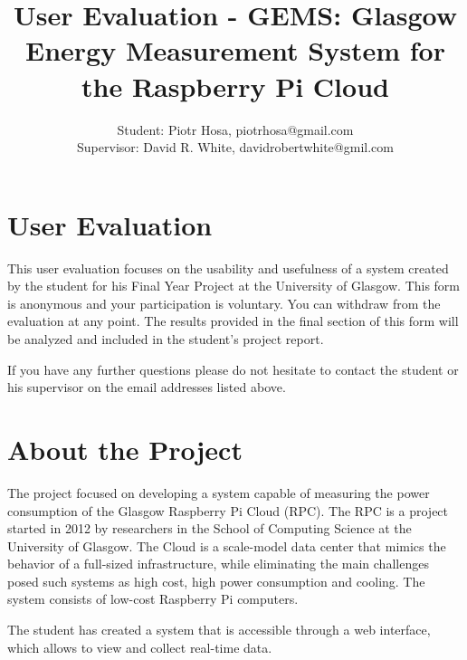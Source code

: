 \documentclass[12pt]{article}
\begin{document}

\title{User Evaluation - GEMS: Glasgow Energy Measurement System for the Raspberry Pi Cloud}
\author{Student: Piotr Hosa, piotrhosa@gmail.com\\Supervisor: David R. White, davidrobertwhite@gmil.com}
\date{\vspace{-5ex}}
\maketitle

\section{User Evaluation}
This user evaluation focuses on the usability and usefulness of a system created by the student for his Final Year Project at the University of Glasgow. This form is anonymous and your participation is voluntary. You can withdraw from the evaluation at any point. The results provided in the final section of this form will be analyzed and included in the student's project report. 

If you have any further questions please do not hesitate to contact the student or his supervisor on the email addresses listed above.

\section{About the Project}
The project focused on developing a system capable of measuring the power consumption of the Glasgow Raspberry Pi Cloud (RPC). The RPC is a project started in 2012 by researchers in the School of Computing Science at the University of Glasgow. The Cloud is a scale-model data center that mimics the behavior of a full-sized infrastructure, while eliminating the main challenges posed such systems as high cost, high power consumption and cooling. The system consists of low-cost Raspberry Pi computers.

The student has created a system that is accessible through a web interface, which allows to view and collect real-time data. 
\end{document}
